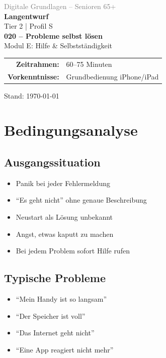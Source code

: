 \documentclass[11pt,a4paper]{article}
\begin{document}
\begin{titlepage}
    \centering
    \vspace*{2cm}
    {\Large\textcolor{gray}{Digitale Grundlagen -- Senioren 65+}}\\[2cm]
    {\Huge\textcolor{fach}{\textbf{Langentwurf}}}\\[0.5cm]
    {\large Tier 2 | Profil S}\\[2cm]
    {\LARGE\textbf{020 -- Probleme selbst lösen}}\\[0.5cm]
    {\large Modul E: Hilfe \& Selbstständigkeit}\\[2cm]
    \begin{tabular}{rl}
        \textbf{Zeitrahmen:} & 60--75 Minuten \\
        \textbf{Vorkenntnisse:} & Grundbedienung iPhone/iPad \\
    \end{tabular}
    \vfill
    {\normalsize Stand: \today}
\end{titlepage}

\tableofcontents
\newpage

\section{Bedingungsanalyse}

\subsection{Ausgangssituation}
\begin{itemize}
    \item Panik bei jeder Fehlermeldung
    \item ``Es geht nicht'' ohne genaue Beschreibung
    \item Neustart als Lösung unbekannt
    \item Angst, etwas kaputt zu machen
    \item Bei jedem Problem sofort Hilfe rufen
\end{itemize}

\subsection{Typische Probleme}
\begin{itemize}
    \item ``Mein Handy ist so langsam''
    \item ``Der Speicher ist voll''
    \item ``Das Internet geht nicht''
    \item ``Eine App reagiert nicht mehr''
\end{itemize}
\end{document}
